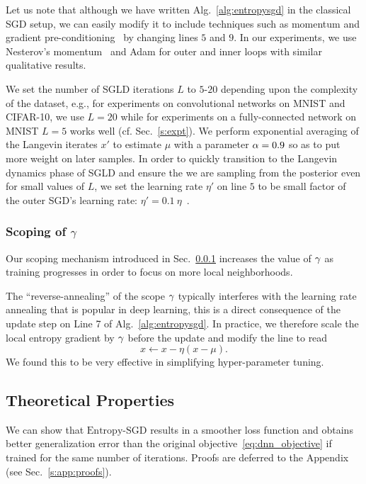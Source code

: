 \documentclass[10pt]{article}
\newcommand{\entropysgd}{\mathrm{Entropy}\textrm{-}\mathrm{SGD}}
\newcommand{\pc}[2]{{\color{ForestGreen}#1}\marginpar{\tiny\noindent{\raggedright{\color{Sienna}[PC]}\color{Sienna}{#2} \par}}}
\newcommand{\todo}[1]{{\color{gray}#1}\marginpar{\tiny\noindent{\raggedright{\color{blue}[TODO]}}}}
\begin{document}
Let us note that although we have written Alg.~\ref{alg:entropysgd} in the classical SGD setup, we can easily modify it to include techniques such as momentum and gradient pre-conditioning~\citep{duchi2011adaptive} by changing lines $5$ and $9$. In our experiments, we use Nesterov's momentum~\citep{sutskever2013importance} and Adam for outer and inner loops with similar qualitative results.

\todo{
We set the number of SGLD iterations $L$ to $5$-$20$ depending upon the complexity of the dataset, e.g., for experiments on convolutional networks on MNIST and CIFAR-10, we use $L = 20$ while for experiments on a fully-connected network on MNIST $L=5$ works well (cf. Sec.~\ref{s:expt}). We perform exponential averaging of the Langevin iterates $x'$ to estimate $\mu$ with a parameter $\alpha = 0.9$ so as to put more weight on later samples. In order to quickly transition to the Langevin dynamics phase of SGLD and ensure the we are sampling from the posterior even for small values of $L$, we set the learning rate $\eta'$ on line $5$ to be small factor of the outer SGD's learning rate: $\eta' = 0.1\ \eta$~\citep{welling2011bayesian}.}


\subsubsection{Scoping of $\gamma$}
\label{ss:scoping}

Our scoping mechanism introduced in Sec.~\ref{ss:scoping} increases the value of $\gamma$ as training progresses in order to focus on more local neighborhoods. 

The ``reverse-annealing'' of the scope $\gamma$ typically interferes with the learning rate annealing that is popular in deep learning, this is a direct consequence of the update step on Line 7 of Alg.~\ref{alg:entropysgd}. In practice, we therefore scale the local entropy gradient by $\gamma$ before the update and modify the line to read
$$
    x \leftarrow x - \eta (x - \mu).
$$
We found this to be very effective in simplifying hyper-parameter tuning.


\subsection{Theoretical Properties}
\label{ss:theoretical_properties}

\pc{We can show that $\entropysgd$ results in a smoother loss function and obtains better generalization error than the original objective~\eqref{eq:dnn_objective} if trained for the same number of iterations. Proofs are deferred to the Appendix (see Sec.~\ref{s:app:proofs}).}{clarify that the analysis here is only a sketch, it is not rigorous}
\end{document}
